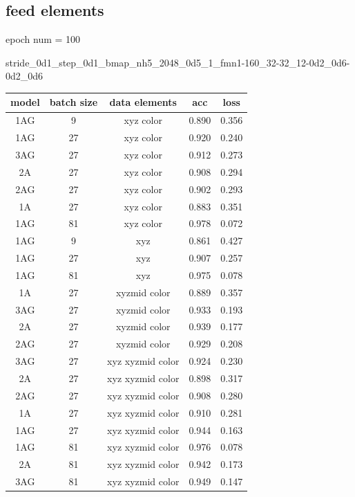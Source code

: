 \documentclass[,table,dvipsnames]{article}
\begin{document}
\subsection{feed elements}
epoch num = 100 \par
stride\_0d1\_step\_0d1\_bmap\_nh5\_2048\_0d5\_1\_fmn1-160\_32-32\_12-0d2\_0d6-0d2\_0d6 \par
\begin{center}
	\begin{tabular}{|c |c | c || c c |} 
		\hline
		model & batch size & data elements & acc & loss \\
		\hline
		1AG & 9 & xyz color & 0.890 & 0.356\\ [0.5ex] 
		\hline
		1AG & 27 & xyz color & 0.920 & 0.240\\ [0.5ex] 
		\hline
		
		3AG & 27 & xyz color& 0.912 & 0.273 \\  [0.5ex]
		\hline
		2A & 27 & xyz color& 0.908 & 0.294 \\  [0.5ex]
		\hline
		2AG & 27 & xyz color& 0.902 & 0.293 \\  [0.5ex]
		\hline
		1A & 27 & xyz color& 0.883 & 0.351 \\  [0.5ex]
		\hline
		1AG & 81 & xyz color & 0.978 & 0.072\\ [0.5ex] 
		\hline\hline
		
		1AG & 9 & xyz  & 0.861 & 0.427\\ [0.5ex] 
		\hline
		1AG & 27 & xyz & 0.907 & 0.257\\ [0.5ex] 
		\hline
		1AG & 81 & xyz & 0.975 & 0.078 \\  [0.5ex]
		\hline\hline
		1A & 27 & xyzmid color& 0.889 & 0.357 \\  [0.5ex]
		\hline
		3AG & 27 & xyzmid color& 0.933 & 0.193 \\  [0.5ex]
		\hline
		
		2A & 27 & xyzmid color& 0.939 & 0.177 \\  [0.5ex]
		\hline
		
		2AG & 27 & xyzmid color& 0.929 & 0.208 \\  [0.5ex]
		\hline\hline
		3AG & 27 & xyz xyzmid color& 0.924 & 0.230 \\  [0.5ex]
		\hline
		
		2A & 27 & xyz xyzmid color& 0.898 & 0.317 \\  [0.5ex]
		\hline
		2AG & 27 & xyz xyzmid color& 0.908 & 0.280 \\  [0.5ex]
		\hline
		1A & 27 & xyz xyzmid color& 0.910 & 0.281 \\  [0.5ex]
		\hline
		1AG & 27 & xyz xyzmid color& 0.944 & 0.163 \\  [0.5ex]
		\hline
		1AG & 81 & xyz xyzmid color& 0.976 & 0.078 \\  [0.5ex]
		\hline
		2A & 81 & xyz xyzmid color& 0.942 & 0.173 \\  [0.5ex]
		\hline
		3AG & 81 & xyz xyzmid color& 0.949 & 0.147 \\  [0.5ex]
		\hline
	\end{tabular}
\end{center}
\end{document}
